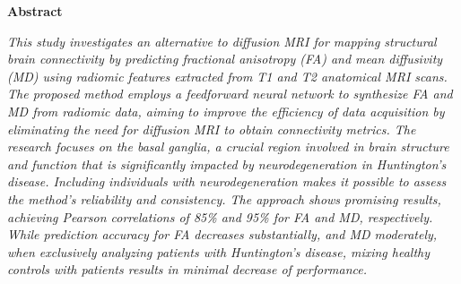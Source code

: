 \thispagestyle{plain}
\begin{center}
    \Large
    \textbf{Abstract}
\end{center}
\textit{This study investigates an alternative to diffusion MRI for mapping structural brain connectivity by predicting fractional anisotropy (FA) and mean diffusivity (MD) using radiomic features extracted from T1 and T2 anatomical MRI scans. The proposed method employs a feedforward neural network to synthesize FA and MD from radiomic data, aiming to improve the efficiency of data acquisition by eliminating the need for diffusion MRI to obtain connectivity metrics. The research focuses on the basal ganglia, a crucial region involved in brain structure and function that is significantly impacted by neurodegeneration in Huntington's disease. Including individuals with neurodegeneration makes it possible to assess the method's reliability and consistency. The approach shows promising results, achieving Pearson correlations of 85\% and 95\% for FA and MD, respectively. While prediction accuracy for FA decreases substantially, and MD moderately, when exclusively analyzing patients with Huntington's disease, mixing healthy controls with patients results in minimal decrease of performance.}